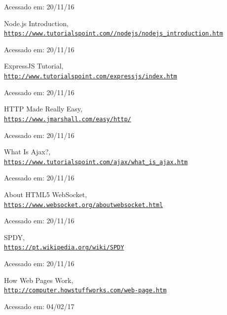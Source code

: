 \documentclass[a4paper,12pt]{article}
\begin{document}
\begin{thebibliography}{50}
Acessado em: 20/11/16


Node.js Introduction,
\\\texttt{\url{https://www.tutorialspoint.com//nodejs/nodejs_introduction.htm}}

Acessado em: 20/11/16


ExpressJS Tutorial,
\\\texttt{\url{http://www.tutorialspoint.com/expressjs/index.htm}}

Acessado em: 20/11/16


HTTP Made Really Easy,
\\\texttt{\url{https://www.jmarshall.com/easy/http/}}

Acessado em: 20/11/16


What Is Ajax?,
\\\texttt{\url{https://www.tutorialspoint.com/ajax/what_is_ajax.htm}}

Acessado em: 20/11/16


About HTML5 WebSocket,
\\\texttt{\url{https://www.websocket.org/aboutwebsocket.html}}

Acessado em: 20/11/16


SPDY,
\\\texttt{\url{https://pt.wikipedia.org/wiki/SPDY}}

Acessado em: 20/11/16


How Web Pages Work,
\\\texttt{\url{http://computer.howstuffworks.com/web-page.htm}}

Acessado em: 04/02/17



\end{thebibliography}
\end{document}
